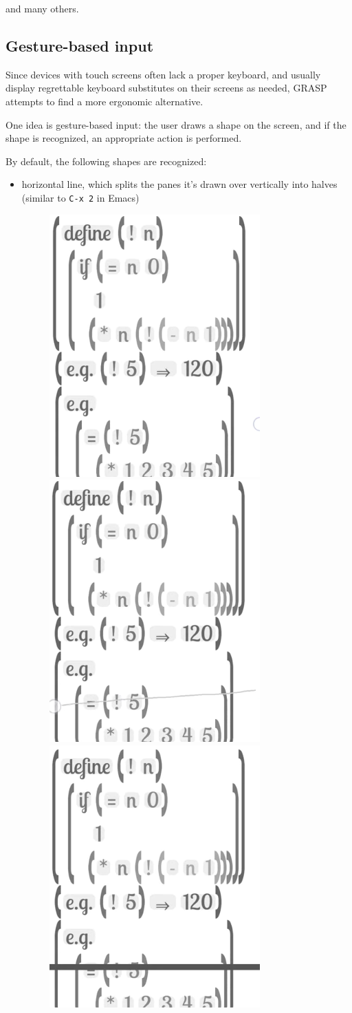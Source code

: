 \documentclass[sigconf]{acmart}
\begin{document}
and many others.

\subsection{Gesture-based input}

Since devices with touch screens often lack
a proper keyboard, and usually display regrettable
keyboard substitutes on their screens as needed,
GRASP attempts to find a more ergonomic alternative.

One idea is gesture-based input: the user draws
a shape on the screen, and if the shape is recognized,
an appropriate action is performed.

By default, the following shapes are recognized:
\begin{itemize}
\item horizontal line, which splits the panes it's
drawn over vertically into halves
(similar to \texttt{C-x 2} in Emacs)

\begin{figure}[H]
  \centering%
  \includegraphics[width=.32\linewidth,frame]{horizontal-line1}\hfill%
  \includegraphics[width=.32\linewidth,frame]{horizontal-line2}\hfill%
  \includegraphics[width=.32\linewidth,frame]{horizontal-line3}\hfill%
\end{figure}


\end{itemize}
\end{document}
